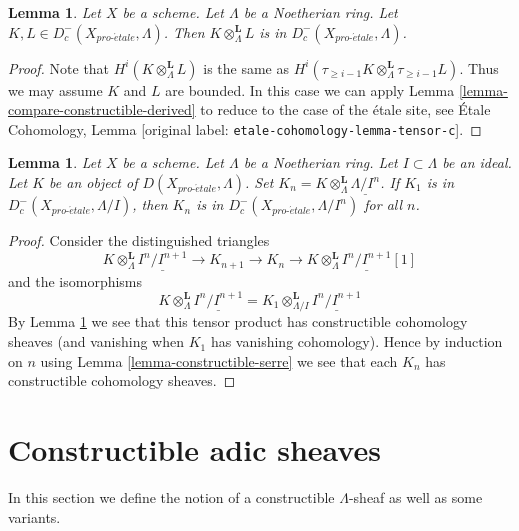 \documentclass[10pt,a4paper]{article}
\theoremstyle{plain}
\newtheorem{lemma}[subsection]{Lemma}
\theoremstyle{definition}
\theoremstyle{remark}
\numberwithin{equation}{subsection}
\def\proetale{{pro\text{-}\acute{e}tale}}
\begin{document}
\begin{lemma}
\label{lemma-tensor-c}
Let $X$ be a scheme. Let $\Lambda$ be a Noetherian ring.
Let $K, L \in D_c^-(X_\proetale, \Lambda)$. Then
$K \otimes_\Lambda^\mathbf{L} L$ is in $D_c^-(X_\proetale, \Lambda)$.
\end{lemma}

\begin{proof}
Note that $H^i(K \otimes_\Lambda^\mathbf{L} L)$ is the same as
$H^i(\tau_{\geq i - 1}K \otimes_\Lambda^\mathbf{L} \tau_{\geq i - 1}L)$.
Thus we may assume $K$ and $L$ are bounded.
In this case we can apply Lemma \ref{lemma-compare-constructible-derived} to
reduce to the case of the \'etale site, see
\'Etale Cohomology, Lemma \textnormal{[original label: \nolinkurl{etale-cohomology-lemma-tensor-c}]}.
\end{proof}

\begin{lemma}
\label{lemma-compare-truncations-constructible}
Let $X$ be a scheme. Let $\Lambda$ be a Noetherian ring.
Let $I \subset \Lambda$ be an ideal.
Let $K$ be an object of $D(X_\proetale, \Lambda)$.
Set $K_n = K \otimes_\Lambda^\mathbf{L} \underline{\Lambda/I^n}$.
If $K_1$ is in $D^-_c(X_\proetale, \Lambda/I)$, then
$K_n$ is in $D^-_c(X_\proetale, \Lambda/I^n)$ for all $n$.
\end{lemma}

\begin{proof}
Consider the distinguished triangles
$$
K \otimes_\Lambda^\mathbf{L} \underline{I^n/I^{n + 1}} \to
K_{n + 1} \to
K_n \to
K \otimes_\Lambda^\mathbf{L} \underline{I^n/I^{n + 1}}[1]
$$
and the isomorphisms
$$
K \otimes_\Lambda^\mathbf{L} \underline{I^n/I^{n + 1}} =
K_1 \otimes_{\Lambda/I}^\mathbf{L} \underline{I^n/I^{n + 1}}
$$
By Lemma \ref{lemma-tensor-c} we see that this tensor product has
constructible cohomology sheaves (and vanishing when $K_1$ has
vanishing cohomology). Hence by induction on $n$ using
Lemma \ref{lemma-constructible-serre}
we see that each $K_n$ has constructible cohomology sheaves.
\end{proof}








\section{Constructible adic sheaves}
\label{section-adic}

\noindent
In this section we define the notion of a constructible
$\Lambda$-sheaf as well as some variants.
\end{document}
